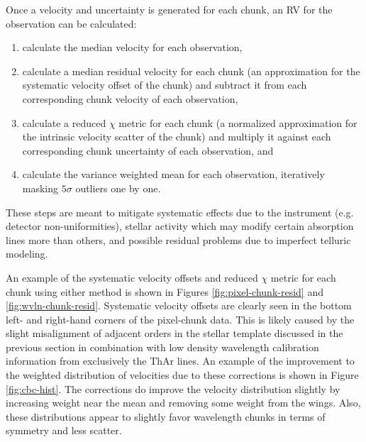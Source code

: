 Once a velocity and uncertainty is generated for each chunk, an RV for the observation can be calculated:
\begin{enumerate}
    \item calculate the median velocity for each observation,
    \item calculate a median residual velocity for each chunk (an approximation for the systematic velocity offset of the chunk) and subtract it from each corresponding chunk velocity of each observation,
    \item calculate a reduced $\chi$ metric for each chunk (a normalized approximation for the intrinsic velocity scatter of the chunk) and multiply it against each corresponding chunk uncertainty of each observation, and
    \item calculate the variance weighted mean for each observation, iteratively masking $5\sigma$ outliers one by one.
\end{enumerate}
These steps are meant to mitigate systematic effects due to the instrument (e.g. detector non-uniformities), stellar activity which may modify certain absorption lines more than others, and possible residual problems due to imperfect telluric modeling.

An example of the systematic velocity offsets and reduced $\chi$ metric for each chunk using either method is shown in Figures \ref{fig:pixel-chunk-resid} and \ref{fig:wvln-chunk-resid}. Systematic velocity offsets are clearly seen in the bottom left- and right-hand corners of the pixel-chunk data. This is likely caused by the slight misalignment of adjacent orders in the stellar template discussed in the previous section in combination with low density wavelength calibration information from exclusively the ThAr lines. An example of the improvement to the weighted distribution of velocities due to these corrections is shown in Figure \ref{fig:cbc-hist}. The corrections do improve the velocity distribution slightly by increasing weight near the mean and removing some weight from the wings. Also, these distributions appear to slightly favor wavelength chunks in terms of symmetry and less scatter.


